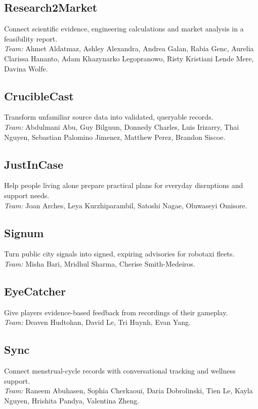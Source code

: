 \documentclass[sigconf,nonacm]{acmart}
\begin{document}
\subsection*{Research2Market}
Connect scientific evidence, engineering calculations and market analysis in a feasibility report.\\
\textit{Team:} Ahmet Aldatmaz, Ashley Alexandra, Andrea Galan, Rabia Genc, Aurelia Clarissa Hananto, Adam Khazynarko Legopranowo, Risty Kristiani Lende Mere, Davina Wolfe.

\subsection*{CrucibleCast}
Transform unfamiliar source data into validated, queryable records.\\
\textit{Team:} Abdulmani Abu, Guy Bilguun, Donnedy Charles, Luis Irizarry, Thai Nguyen, Sebastian Palomino Jimenez, Matthew Perez, Brandon Siscoe.

\subsection*{JustInCase}
Help people living alone prepare practical plans for everyday disruptions and support needs.\\
\textit{Team:} Joan Arches, Leya Kurzhiparambil, Satoshi Nagae, Oluwaseyi Omisore.

\subsection*{Signum}
Turn public city signals into signed, expiring advisories for robotaxi fleets.\\
\textit{Team:} Misha Bari, Mridhul Sharma, Cherise Smith-Medeiros.

\subsection*{EyeCatcher}
Give players evidence-based feedback from recordings of their gameplay.\\
\textit{Team:} Deaven Hudtohan, David Le, Tri Huynh, Evan Yang.

\subsection*{Sync}
Connect menstrual-cycle records with conversational tracking and wellness support.\\
\textit{Team:} Raneem Abuhasen, Sophia Cherkaoui, Daria Dobrolinski, Tien Le, Kayla Nguyen, Hrishita Pandya, Valentina Zheng.
\end{document}
